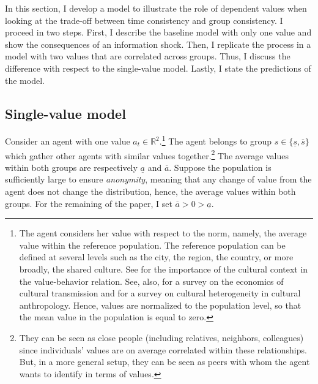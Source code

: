In this section, I develop a model to illustrate the role of dependent values when looking at the trade-off between time consistency and group consistency. I proceed in two steps. First, I describe the baseline model with only one value and show the consequences of an information shock. Then, I replicate the process in a model with two values that are correlated across groups. Thus, I discuss the difference with respect to the single-value model. Lastly, I state the predictions of the model.

\subsection{Single-value model}

Consider an agent with one value $a_t \in \mathbb{R}^2$.\footnote{The agent considers her value with respect to the norm, namely, the average value within the reference population. The reference population can be defined at several levels such as the city, the region, the country, or more broadly, the shared culture. See \citet{Roccas2010Personal} for the importance of the cultural context in the value-behavior relation. See, also, \citet{Bisin2011Economics} for a survey on the economics of cultural transmission and \citet{Rapport2014Social} for a survey on cultural heterogeneity in cultural anthropology. Hence, values are normalized to the population level, so that the mean value in the population is equal to zero.}
The agent belongs to group $s \in \{\underline{s}, \overline{s}\}$ which gather other agents with similar values together.\footnote{They can be seen as close people (including relatives, neighbors, colleagues) since individuals' values are on average correlated within these relationships. But, in a more general setup, they can be seen as peers with whom the agent wants to identify in terms of values.}
The average values within both groups are respectively $\underline{a}$ and $\overline{a}$. 
Suppose the population is sufficiently large to ensure \textit{anonymity}, meaning that any change of value from the agent does not change the distribution, hence, the average values within both groups.
For the remaining of the paper, I set $\overline{a} > 0 > \underline{a}$.

